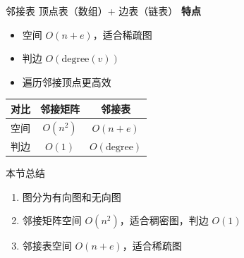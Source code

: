 \documentclass[10pt, aspectratio=169]{beamer}
\begin{document}
\begin{frame}{邻接表}
顶点表（数组）+ 边表（链表）
\vspace{0.3em}
\textbf{特点}
\begin{itemize}
\item 空间 $O(n+e)$，适合稀疏图
\item 判边 $O(\text{degree}(v))$
\item 遍历邻接顶点更高效
\end{itemize}
\vspace{0.3em}
\begin{tabular}{|c|c|c|}
\hline 对比 & 邻接矩阵 & 邻接表 \\ \hline
空间 & $O(n^2)$ & $O(n+e)$ \\ \hline
判边 & $O(1)$ & $O(\text{degree})$ \\ \hline
\end{tabular}
\end{frame}
\begin{frame}{本节总结}
\begin{enumerate}
\item 图分为有向图和无向图
\item 邻接矩阵空间 $O(n^2)$，适合稠密图，判边 $O(1)$
\item 邻接表空间 $O(n+e)$，适合稀疏图
\end{enumerate}
\end{frame}
\end{document}
